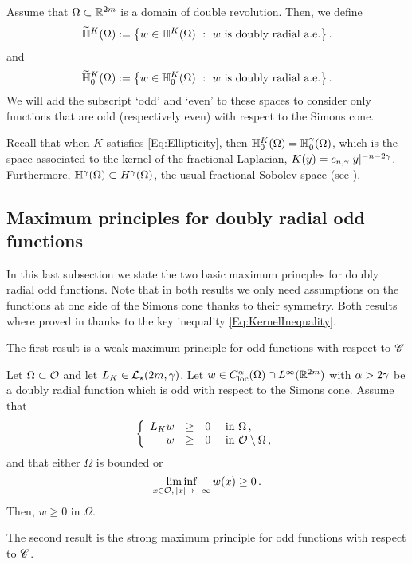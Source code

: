 Assume that $\Omega \subset \mathbb{R}^{2m}$ is a domain of double revolution. Then, we define
$$
\widetilde{\mathbb{H}}^K(\Omega) := \left \{ w \in \mathbb{H}^K(\Omega) \ : \ w \textrm{ is doubly radial a.e.} \right \}.
$$
and
$$
\widetilde{\mathbb{H}}^K_0(\Omega) := \left \{ w \in \mathbb{H}^K_0(\Omega) \ : \ w \textrm{ is doubly radial a.e.} \right \}.
$$
We will add the subscript `odd' and `even' to these spaces to consider only functions that are odd (respectively even) with respect to the Simons cone.

Recall that when $K$ satisfies \eqref{Eq:Ellipticity}, then $\mathbb{H}^K_0 (\Omega) = \mathbb{H}^\gamma_0 (\Omega)$, which is the space associated to the kernel of the fractional Laplacian, $K(y) = c_{n,\gamma}|y|^{-n-2\gamma}$. Furthermore, $\mathbb{H}^\gamma(\Omega) \subset H^\gamma(\Omega)$, the usual fractional Sobolev space (see \cite{HitchhikerGuide,CozziPassalacqua}). 


\subsection{Maximum principles for doubly radial odd functions}
\label{Subsec:MaxPrinciples}

In this last subsection we state the two basic maximum princples for doubly radial odd functions. Note that in both results we only need assumptions on the functions at one side of the Simons cone thanks to their symmetry. Both results where proved in \cite{FelipeSanz-Perela:IntegroDifferentialI} thanks to the key inequality \eqref{Eq:KernelInequality}.

The first result is a weak maximum principle for odd functions with respect to $\mathscr{C}$

\begin{proposition}
\label{Prop:WeakMaximumPrincipleForOddFunctions}
 Let $\Omega \subset \mathcal{O}$ and let $L_K  \in \mathcal{L}_\star (2m,  \gamma)$.  Let $w\in C^{\alpha}_{\mathrm{loc}}(\Omega)\cap L^\infty(\mathbb{R}^{2m})$ with $\alpha > 2\gamma$ be a doubly radial function which is odd with respect to the Simons cone. Assume that
 $$
 \left\{\begin{array}{rcll}
 L_K w & \geq & 0 & \text{ in } \Omega\,,\\
 w & \geq & 0 & \text{ in } \mathcal{O} \setminus \Omega\,,
 \end{array} \right.
 $$
 and that either $\Omega$ is bounded or 
 $$
 \liminf_{x \in \mathcal{O},\,|x|\to +\infty} w(x) \geq 0\,.
 $$
 Then, $w \geq 0$ in $\Omega$.
\end{proposition}

The second result is the strong maximum principle for odd functions with respect to $\mathscr{C}$.

